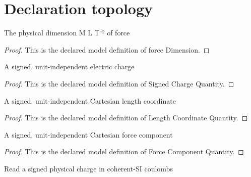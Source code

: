 \section{Declaration topology}
\begin{definition}
  \label{def:physics:phyx-mini-0897:phyxminiproblems-problemphyxmini0897-forcedimension}
  The physical dimension M L T⁻² of force
\end{definition}
\begin{proof}
  This is the declared model definition of force Dimension.
\end{proof}
\begin{definition}
  \label{def:physics:phyx-mini-0897:phyxminiproblems-problemphyxmini0897-signedchargequantity}
  A signed, unit-independent electric charge
\end{definition}
\begin{proof}
  This is the declared model definition of Signed Charge Quantity.
\end{proof}
\begin{definition}
  \label{def:physics:phyx-mini-0897:phyxminiproblems-problemphyxmini0897-lengthcoordinatequantity}
  A signed, unit-independent Cartesian length coordinate
\end{definition}
\begin{proof}
  This is the declared model definition of Length Coordinate Quantity.
\end{proof}
\begin{definition}
  \label{def:physics:phyx-mini-0897:phyxminiproblems-problemphyxmini0897-forcecomponentquantity}
  A signed, unit-independent Cartesian force component
\end{definition}
\begin{proof}
  This is the declared model definition of Force Component Quantity.
\end{proof}
\begin{definition}
  \label{def:physics:phyx-mini-0897:phyxminiproblems-problemphyxmini0897-chargeincoulombs}
  Read a signed physical charge in coherent-SI coulombs
\end{definition}
